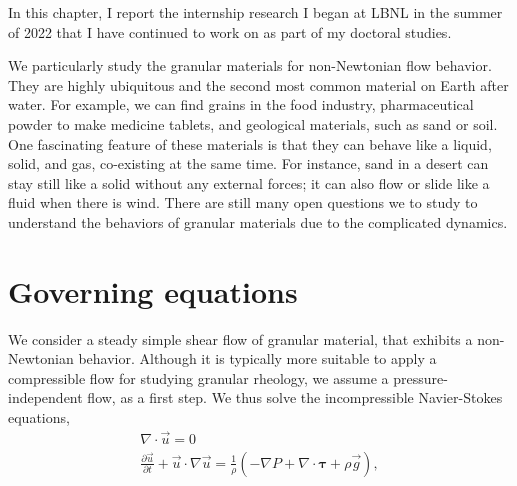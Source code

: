 \par
In this chapter, I report the internship research I began at LBNL in the summer of 2022 that I have continued to work on as part of my doctoral studies.
\par
We particularly study the granular materials for non-Newtonian flow behavior. They are highly ubiquitous and the second most common material on Earth after water. 
For example, we can find grains in the food industry, pharmaceutical powder to make medicine tablets, and geological materials, such as sand or soil.
One fascinating feature of these materials is that they can behave like a liquid, solid, and gas, co-existing at the same time. For instance, sand in a desert can stay still like a solid without any external forces; it can also flow or slide like a fluid when there is wind.
There are still many open questions we to study to understand the behaviors of granular materials due to the complicated dynamics.



\section{Governing equations}
We consider a steady simple shear flow of granular material, that exhibits a non-Newtonian behavior. Although it is typically more suitable to apply a compressible flow for studying granular rheology, we assume a pressure-independent flow, as a first step. 
We thus solve the incompressible Navier-Stokes equations,
\begin{align}
  \nabla \cdot \vec{u} = 0 
  \label{eq_div_free} 
  \\
  \frac{\partial \vec{u}}{\partial t} + \vec{u}\cdot \nabla \vec{u}
  = \frac{1}{\rho}
  \left(
  - \nabla P 
      + \nabla \cdot   \bm{\tau} 
      +  \rho  \vec{g} 
      \right),
    \label{eq_NS_ch4}
\end{align}

